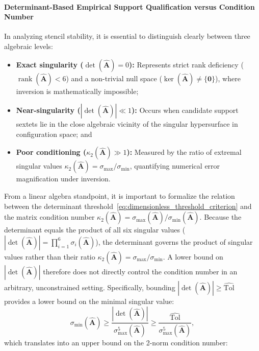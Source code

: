 \documentclass[preprint,12pt]{elsarticle}
\begin{document}
\paragraph{Determinant-Based Empirical Support Qualification versus Condition Number}
In analyzing stencil stability, it is essential to distinguish clearly between three algebraic levels:
\begin{itemize}
    \item \textbf{Exact singularity ($\det(\widehat{\mathbf{A}}) = 0$):} Represents strict rank deficiency ($\operatorname{rank}(\widehat{\mathbf{A}}) < 6$) and a non-trivial null space ($\ker(\widehat{\mathbf{A}}) \neq \{\mathbf{0}\}$), where inversion is mathematically impossible;
    \item \textbf{Near-singularity ($|\det(\widehat{\mathbf{A}})| \ll 1$):} Occurs when candidate support sextets lie in the close algebraic vicinity of the singular hypersurface in configuration space; and
    \item \textbf{Poor conditioning ($\kappa_2(\widehat{\mathbf{A}}) \gg 1$):} Measured by the ratio of extremal singular values $\kappa_2(\widehat{\mathbf{A}}) = \sigma_{\max} / \sigma_{\min}$, quantifying numerical error magnification under inversion.
\end{itemize}
From a linear algebra standpoint, it is important to formalize the relation between the determinant threshold~\eqref{eq:dimensionless_threshold_criterion} and the matrix condition number $\kappa_2(\widehat{\mathbf{A}}) = \sigma_{\max}(\widehat{\mathbf{A}}) / \sigma_{\min}(\widehat{\mathbf{A}})$. Because the determinant equals the product of all six singular values ($|\det(\widehat{\mathbf{A}})| = \prod_{i=1}^6 \sigma_i(\widehat{\mathbf{A}})$), the determinant governs the product of singular values rather than their ratio $\kappa_2(\widehat{\mathbf{A}}) = \sigma_{\max} / \sigma_{\min}$. A lower bound on $|\det(\widehat{\mathbf{A}})|$ therefore does not directly control the condition number in an arbitrary, unconstrained setting. Specifically, bounding $|\det(\widehat{\mathbf{A}})| \ge \widehat{\mathrm{Tol}}$ provides a lower bound on the minimal singular value:
\begin{equation}
    \sigma_{\min}(\widehat{\mathbf{A}}) \ge \frac{|\det(\widehat{\mathbf{A}})|}{\sigma_{\max}^5(\widehat{\mathbf{A}})} \ge \frac{\widehat{\mathrm{Tol}}}{\sigma_{\max}^5(\widehat{\mathbf{A}})},
    \label{eq:sigma_min_bound}
\end{equation}
which translates into an upper bound on the 2-norm condition number:
\end{document}
